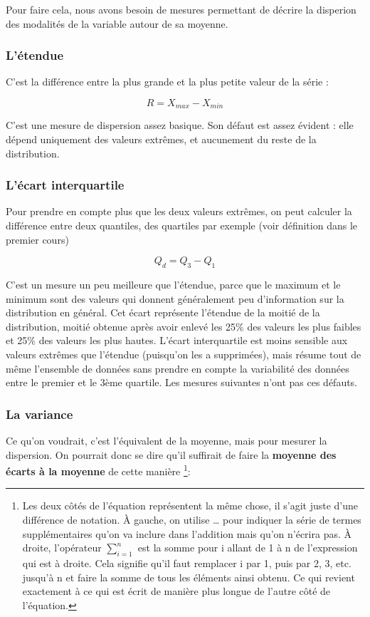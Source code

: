 \documentclass[
]{book}
\begin{document}
Pour faire cela, nous avons besoin de mesures permettant de décrire la disperion des modalités de la variable autour de sa moyenne.

\hypertarget{luxe9tendue}{%
\subsubsection{L'étendue}\label{luxe9tendue}}

C'est la différence entre la plus grande et la plus petite valeur de la série :

\[R = X_{max} - X_{min}\]

C'est une mesure de dispersion assez basique. Son défaut est assez évident : elle dépend uniquement des valeurs extrêmes, et aucunement du reste de la distribution.

\hypertarget{luxe9cart-interquartile}{%
\subsubsection{L'écart interquartile}\label{luxe9cart-interquartile}}

Pour prendre en compte plus que les deux valeurs extrêmes, on peut calculer la différence entre deux quantiles, des quartiles par exemple (voir définition dans le premier cours)

\[ Q_d = Q_3 - Q_1 \]

C'est un mesure un peu meilleure que l'étendue, parce que le maximum et le minimum sont des valeurs qui donnent généralement peu d'information sur la distribution en général. Cet écart représente l'étendue de la moitié de la distribution, moitié obtenue après avoir enlevé les 25\% des valeurs les plus faibles et 25\% des valeurs les plus hautes. L'écart interquartile est moins sensible aux valeurs extrêmes que l'étendue (puisqu'on les a supprimées), mais résume tout de même l'ensemble de données sans prendre en compte la variabilité des données entre le premier et le 3ème quartile. Les mesures suivantes n'ont pas ces défauts.

\hypertarget{la-variance}{%
\subsubsection{La variance}\label{la-variance}}

Ce qu'on voudrait, c'est l'équivalent de la moyenne, mais pour mesurer la dispersion. On pourrait donc se dire qu'il suffirait de faire la \textbf{moyenne des écarts à la moyenne} de cette manière \footnote{Les deux côtés de l'équation représentent la même chose, il s'agit juste d'une différence de notation. À gauche, on utilise \ldots{} pour indiquer la série de termes supplémentaires qu'on va inclure dans l'addition mais qu'on n'écrira pas. À droite, l'opérateur \(\sum_{i = 1}^{n}\) est la somme pour i allant de 1 à n de l'expression qui est à droite. Cela signifie qu'il faut remplacer i par 1, puis par 2, 3, etc. jusqu'à n et faire la somme de tous les éléments ainsi obtenu. Ce qui revient exactement à ce qui est écrit de manière plus longue de l'autre côté de l'équation.}:
\end{document}
